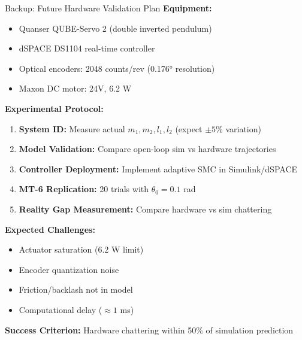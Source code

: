 \documentclass[10pt,aspectratio=169]{beamer}
\begin{document}
\begin{frame}{Backup: Future Hardware Validation Plan}
\textbf{Equipment:}
\begin{itemize}
    \item Quanser QUBE-Servo 2 (double inverted pendulum)
    \item dSPACE DS1104 real-time controller
    \item Optical encoders: 2048 counts/rev (0.176° resolution)
    \item Maxon DC motor: 24V, 6.2 W
\end{itemize}

\vspace{0.3cm}
\textbf{Experimental Protocol:}
\begin{enumerate}
    \item \textbf{System ID:} Measure actual $m_1, m_2, l_1, l_2$ (expect $\pm 5\%$ variation)
    \item \textbf{Model Validation:} Compare open-loop sim vs hardware trajectories
    \item \textbf{Controller Deployment:} Implement adaptive SMC in Simulink/dSPACE
    \item \textbf{MT-6 Replication:} 20 trials with $\theta_0 = 0.1$ rad
    \item \textbf{Reality Gap Measurement:} Compare hardware vs sim chattering
\end{enumerate}

\vspace{0.3cm}
\textbf{Expected Challenges:}
\begin{itemize}
    \item Actuator saturation (6.2 W limit)
    \item Encoder quantization noise
    \item Friction/backlash not in model
    \item Computational delay ($\approx 1$ ms)
\end{itemize}

\vspace{0.3cm}
\textbf{Success Criterion:} Hardware chattering within 50\% of simulation prediction
\end{frame}
\end{document}

